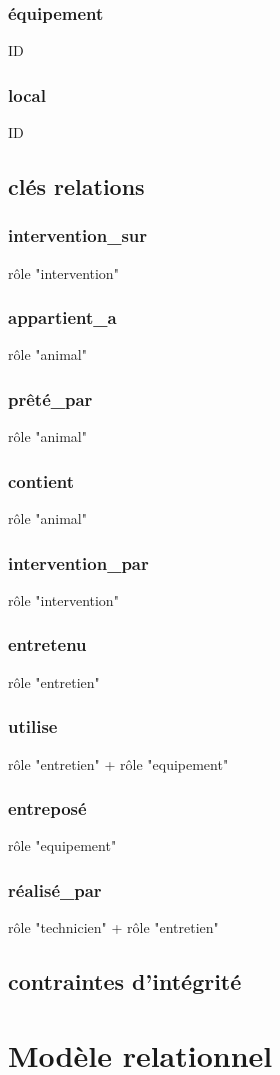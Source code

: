 \documentclass[11pt]{article}
\begin{document}
\subsubsection{équipement}
ID
\subsubsection{local}
ID

\subsection{clés relations}
\subsubsection{intervention\_sur}
rôle "intervention"
\subsubsection{appartient\_a}
rôle "animal"
\subsubsection{prêté\_par}
rôle "animal"
\subsubsection{contient}
rôle "animal"
\subsubsection{intervention\_par}
rôle "intervention"
\subsubsection{entretenu}
rôle "entretien"
\subsubsection{utilise}
rôle "entretien" + rôle "equipement"
\subsubsection{entreposé}
rôle "equipement"
\subsubsection{réalisé\_par}
rôle "technicien" + rôle "entretien"
\subsection{contraintes d'intégrité}
\section{Modèle relationnel}
\end{document}
